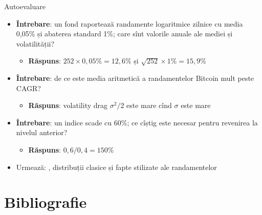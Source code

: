 \begin{frame}{Autoevaluare}
\itemsize{\small}
\begin{itemize}
    \item \textbf{Întrebare}: un fond raportează randamente logaritmice zilnice cu media 0,05\% și abaterea standard 1\%; care sînt valorile anuale ale mediei și volatilității?
    \begin{itemize}
        \item \textbf{Răspuns}: $252 \times 0{,}05\% = 12{,}6\%$ și $\sqrt{252} \times 1\% = 15{,}9\%$
    \end{itemize}
    \item \textbf{Întrebare}: de ce este media aritmetică a randamentelor Bitcoin mult peste CAGR?
    \begin{itemize}
        \item \textbf{Răspuns}: volatility drag $\sigma^2/2$ este mare cînd $\sigma$ este mare
    \end{itemize}
    \item \textbf{Întrebare}: un indice scade cu 60\%; ce cîștig este necesar pentru revenirea la nivelul anterior?
    \begin{itemize}
        \item \textbf{Răspuns}: $0{,}6/0{,}4 = 150\%$
    \end{itemize}
    \item Urmează: , distribuții clasice și fapte stilizate ale randamentelor
\end{itemize}
\end{frame}


\section{Bibliografie}


